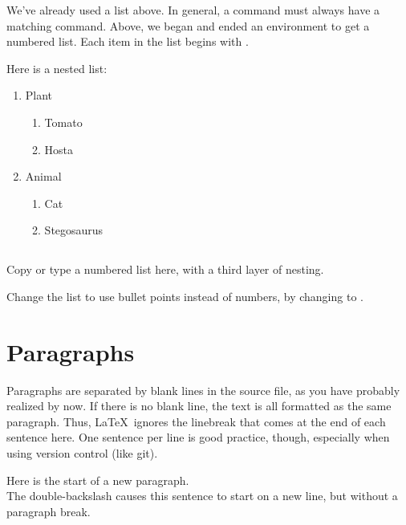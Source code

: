 \documentclass{article}
\begin{document}
We've already used a list above.
In general, a \latexcode{\\begin} command must always have a matching \latexcode{\\end} command.
Above, we began and ended an  environment to get a numbered list.
Each item in the list begins with \latexcode{\\item}.

Here is a nested list:
\begin{enumerate}
    \item Plant
    \begin{enumerate}
        \item Tomato
        \item Hosta
    \end{enumerate}
    \item Animal
    \begin{enumerate}
        \item Cat
        \item Stegosaurus
    \end{enumerate}
\end{enumerate}

\subsection{\task}

Copy or type a numbered list here, with a third layer of nesting.

Change the list to use bullet points instead of numbers, by changing  to .

\section{Paragraphs}
\label{sec:paragraphs}

Paragraphs are separated by blank lines in the source file, as you have probably realized by now.
If there is no blank line, the text is all formatted as the same paragraph.
Thus, \LaTeX\ ignores the linebreak that comes at the end of each sentence here.
One sentence per line is good practice, though, especially when using version control (like git).

Here is the start of a new paragraph.  \\
The double-backslash causes this sentence to start on a new line, but without a paragraph break.
\end{document}

